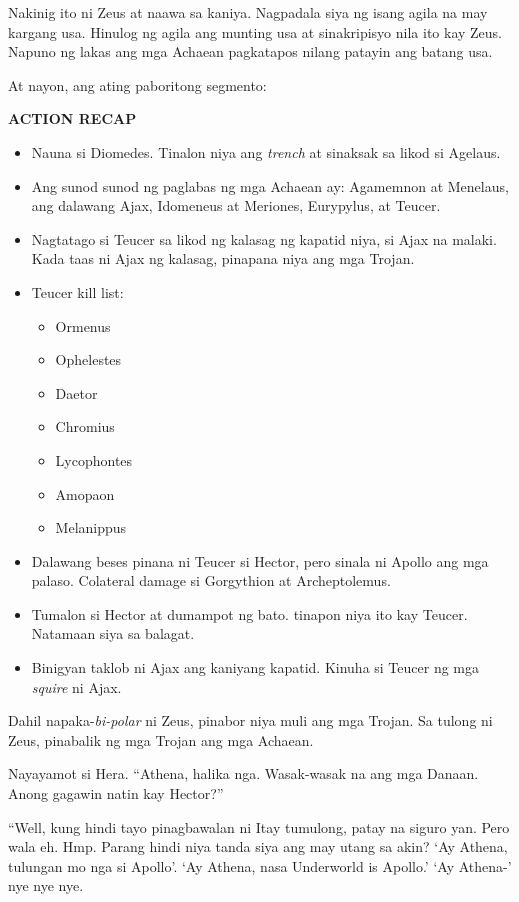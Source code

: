 \documentclass[12pt,letterpaper]{report}
\newenvironment{recap}{\begin{samepage}\begin{center}{\large\textbf{ACTION RECAP}}\begin{itemize}}{\end{itemize}\end{center}\end{samepage}}
\begin{document}
Nakinig ito ni Zeus at naawa sa kaniya. Nagpadala siya ng isang agila na may kargang usa. Hinulog ng agila ang munting usa at sinakripisyo nila ito kay Zeus. Napuno ng lakas ang mga Achaean pagkatapos nilang patayin ang batang usa.

At nayon, ang ating paboritong segmento:

\begin{recap}
    \item Nauna si Diomedes. Tinalon niya ang \textit{trench} at sinaksak sa likod si Agelaus.
    \item Ang sunod sunod ng paglabas ng mga Achaean ay: Agamemnon at Menelaus, ang dalawang Ajax, Idomeneus at Meriones, Eurypylus, at Teucer.
    \item Nagtatago si Teucer sa likod ng kalasag ng kapatid niya, si Ajax na malaki. Kada taas ni Ajax ng kalasag, pinapana niya ang mga Trojan.
    \item Teucer kill list:
    \begin{itemize}
        \item Ormenus
        \item Ophelestes
        \item Daetor
        \item Chromius
        \item Lycophontes
        \item Amopaon
        \item Melanippus
    \end{itemize}
    \item Dalawang beses pinana ni Teucer si Hector, pero sinala ni Apollo ang mga palaso. Colateral damage si Gorgythion at Archeptolemus.
    \item Tumalon si Hector at dumampot ng bato. tinapon niya ito kay Teucer. Natamaan siya sa balagat.
    \item Binigyan taklob ni Ajax ang kaniyang kapatid. Kinuha si Teucer ng mga \textit{squire} ni Ajax.
\end{recap}

Dahil napaka-\textit{bi-polar} ni Zeus, pinabor niya muli ang mga Trojan. Sa tulong ni Zeus, pinabalik ng mga Trojan ang mga Achaean.

Nayayamot si Hera. ``Athena, halika nga. Wasak-wasak na ang mga Danaan. Anong gagawin natin kay Hector?''

``Well, kung hindi tayo pinagbawalan ni Itay tumulong, patay na siguro yan. Pero wala eh. Hmp. Parang hindi niya tanda siya ang may utang sa akin? `Ay Athena, tulungan mo nga si Apollo'. `Ay Athena, nasa Underworld is Apollo.' `Ay Athena-' nye nye nye.
\end{document}
